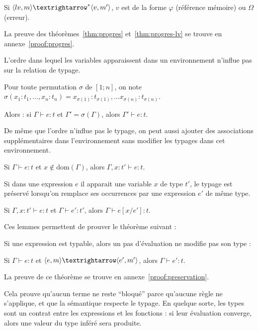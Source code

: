 \begin{theorem}
  \label{thm:progres-lv}

  Si $\mmstar{m}{lv}{m'}{v}$, $v$ est de la forme $φ$ (référence mémoire) ou $Ω$
  (erreur).

\end{theorem}


La preuve des
théorèmes~\ref{thm:progres}
et~\ref{thm:progres-lv}
se trouve en annexe~\ref{proof:progres}.

\begin{lemma}[Permutation]
  L'ordre dans lequel les variables apparaissent dans un environnement
  n'influe pas sur la relation de typage.

  Pour toute permutation $σ$ de $[1;n]$, on note $σ(x_1 : t_1, …, x_n : t_n) =
  x_{σ(1)} : t_{σ(1)}, … x_{σ(n)} : t_{σ(n)}$.

  Alors : si $Γ ⊢ e : t$ et $Γ' = σ(Γ)$, alors $Γ' ⊢ e : t$.
\end{lemma}

\begin{lemma}[Affaiblissement]
  De même que l'ordre n'influe pas le typage, on peut aussi ajouter des
  associations supplémentaires dans l'environnement sans modifier les typages
  dans cet environnement.

  Si $Γ ⊢ e : t$ et $x ∉ \mathrm{dom}(Γ)$, alors $Γ, x : t' ⊢ e : t$.
\end{lemma}

\begin{lemma}[Substitution]
  Si dans une expression $e$ il apparait une variable $x$ de type $t'$, le
  typage est préservé lorsqu'on remplace ses occurrences par une expression $e'$
  de même type.

  Si $Γ, x : t' ⊢ e : t$ et $Γ ⊢ e' : t'$, alors $Γ ⊢ e [x/e'] : t$.
\end{lemma}

Ces lemmes permettent de prouver le théorème suivant :

\begin{theorem}[Préservation]
  \label{thm:preservation}

  Si une expression est typable, alors un pas d'évaluation ne modifie pas son
  type :

  Si $Γ ⊢ e : t$ et $\mm{m}{e}{m'}{e'}$, alors $Γ ⊢ e' : t$.

\end{theorem}

La preuve de ce théorème se trouve en annexe~\ref{proof:preservation}.

Cela prouve qu'aucun terme ne reste ``bloqué'' parce qu'aucune règle ne
s'applique, et que la sémantique respecte le typage. En quelque sorte, les types
sont un contrat entre les expressions et les fonctions : si leur évaluation
converge, alors une valeur du type inféré sera produite.

